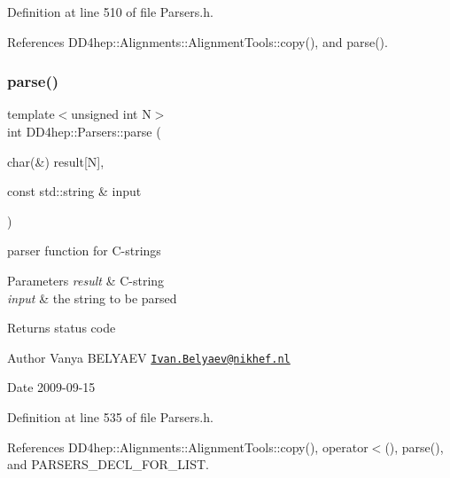 Definition at line 510 of file Parsers.\+h.



References D\+D4hep\+::\+Alignments\+::\+Alignment\+Tools\+::copy(), and parse().

\hypertarget{namespace_d_d4hep_1_1_parsers_a6f63b6224a4074e16a6ff5d851170427}{}\label{namespace_d_d4hep_1_1_parsers_a6f63b6224a4074e16a6ff5d851170427} 
\subsubsection{\texorpdfstring{parse()}{parse()}\hspace{0.1cm}{\footnotesize\ttfamily [18/21]}}
{\footnotesize\ttfamily template$<$unsigned int N$>$ \\
int D\+D4hep\+::\+Parsers\+::parse (\begin{DoxyParamCaption}\item[{char(\&)}]{result\mbox{[}\+N\mbox{]},  }\item[{const std\+::string \&}]{input }\end{DoxyParamCaption})}



parser function for C-\/strings 


\begin{DoxyParams}{Parameters}
{\em result} & C-\/string \\
\hline
{\em input} & the string to be parsed \\
\hline
\end{DoxyParams}
\begin{DoxyReturn}{Returns}
status code 
\end{DoxyReturn}
\begin{DoxyAuthor}{Author}
Vanya B\+E\+L\+Y\+A\+EV \href{mailto:Ivan.Belyaev@nikhef.nl}{\tt Ivan.\+Belyaev@nikhef.\+nl} 
\end{DoxyAuthor}
\begin{DoxyDate}{Date}
2009-\/09-\/15 
\end{DoxyDate}


Definition at line 535 of file Parsers.\+h.



References D\+D4hep\+::\+Alignments\+::\+Alignment\+Tools\+::copy(), operator$<$(), parse(), and P\+A\+R\+S\+E\+R\+S\+\_\+\+D\+E\+C\+L\+\_\+\+F\+O\+R\+\_\+\+L\+I\+ST.

\hypertarget{namespace_d_d4hep_1_1_parsers_a7d90cf46a4c38175eed16be4cbc97d20}{}\label{namespace_d_d4hep_1_1_parsers_a7d90cf46a4c38175eed16be4cbc97d20} 

